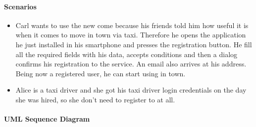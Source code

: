 \paragraph{Scenarios}
\begin{itemize}
	\item Carl wants to use the new come \myTaxiService{} because his friends told him how useful it is when it comes to move in town via taxi.
	Therefore he opens the \myTaxiService{} application he just installed in his smartphone and presses the registration button.
	He fill all the required fields with his data, accepts \myTaxiService{} conditions and then a dialog confirms his registration to the service.
	An email also arrives at his address.
	Being now a registered user, he can start using \myTaxiService{} in town.
	\item Alice is a taxi driver and she got his taxi driver login credentials on the day she was hired, so she don't need to register to \myTaxiService{} at all.
\end{itemize}
\paragraph{UML Sequence Diagram}
